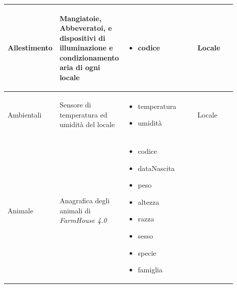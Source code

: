 \documentclass[12pt,a4paper]{article}
\begin{document}
\begin{center}
\begin{longtable}{|p{0.14\linewidth}|p{0.20\linewidth}|p{0.36\linewidth}|p{0.20\linewidth}|}
\hline
Allestimen\-to 		& \begin{flushleft}\vspace{-25pt} Mangiatoie, Abbeveratoi, e dispositivi di illuminazione e condizionamento aria di ogni locale \end{flushleft}
					& \begin{itemize}
						\setlength{\itemindent}{-1em}
						\vspace{-25pt}
						\setlength\itemsep{-0.25em}
						\item codice
						
					\end{itemize}
					& \begin{flushleft}\vspace{-25pt} Locale \end{flushleft}\\

\hline
Ambientali 			& \begin{flushleft}\vspace{-25pt} Sensore di temperatura ed umidità del locale  \end{flushleft}
					& \begin{itemize}
						\setlength{\itemindent}{-1em}
						\vspace{-25pt}
						\setlength\itemsep{-0.25em}
						\item temperatura
						\item umidità
					\end{itemize}
					& \begin{flushleft}\vspace{-25pt} Locale \end{flushleft}\\

\hline
Animale 				& \begin{flushleft}\vspace{-25pt} Anagrafica degli animali di \textit{FarmHouse 4.0} \end{flushleft}
					& \begin{itemize}
						\setlength{\itemindent}{-1em}
						\vspace{-25pt}
						\setlength\itemsep{-0.25em}
						\item codice
						\item dataNascita
						\item peso
						\item altezza
						\item razza
						\item sesso
						\item specie
						\item famiglia
						

\end{itemize}
\end{longtable}
\end{center}
\end{document}
